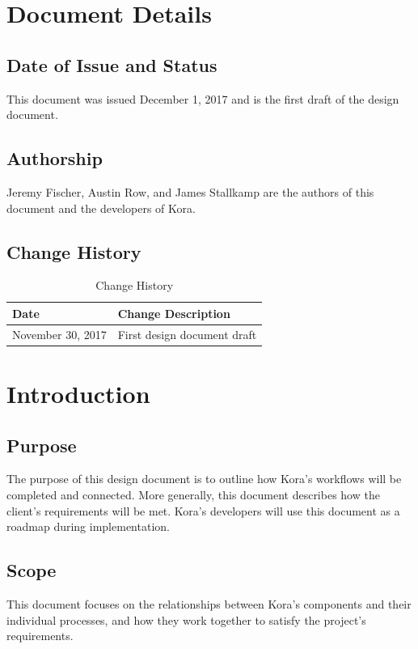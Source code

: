\documentclass[onecolumn, draftclsnofoot,10pt, compsoc]{IEEEtran}
\def \botname{Kora\xspace}
\begin{document}
\section{Document Details}
	\subsection{Date of Issue and Status}
		This document was issued December 1, 2017 and is the first draft of the design document.

	\subsection{Authorship}
		Jeremy Fischer, Austin Row, and James Stallkamp are the authors of this document and the developers of \botname.
		
	\subsection{Change History}
		\begin{table}[H]
			\centering
			\caption{Change History}
			\label{my-label}
			\begin{tabular}{|l|l|}
				\hline
				\textbf{Date}     & \textbf{Change Description}   \\ \hline
				November 30, 2017 & {First design document draft} \\ \hline
			\end{tabular}
		\end{table}

\section{Introduction}
	\subsection{Purpose}
		The purpose of this design document is to outline how \botname's workflows will be completed and connected.
		More generally, this document describes how the client's requirements will be met.
		\botname's developers will use this document as a roadmap during implementation.

	\subsection{Scope}
		This document focuses on the relationships between \botname's components and their individual processes, and how they work together to satisfy the project's requirements.
	
\end{document}

